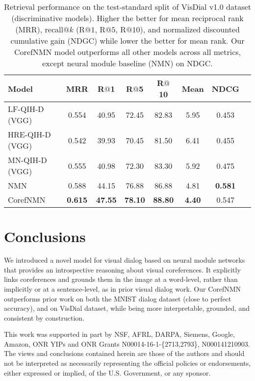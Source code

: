 \documentclass[runningheads]{llncs}
\makeatletter
\def\adl@drawiv#1#2#3{\hskip.5\tabcolsep
        \xleaders#3{#2.5\@tempdimb #1{1}#2.5\@tempdimb}#2\z@ plus1fil minus1fil\relax
        \hskip.5\tabcolsep}
\newcommand{\cdashlinelr}[1]{\noalign{\vskip\aboverulesep
           \global\let\@dashdrawstore\adl@draw
           \global\let\adl@draw\adl@drawiv}
  \cdashline{#1}
  \noalign{\global\let\adl@draw\@dashdrawstore
           \vskip\belowrulesep}}
\newcommand{\nmn}{CorefNMN\xspace}
\newcommand{\myparagraph}[1]{\vspace{0pt}\noindent{\bf #1}}
\makeatother
\begin{document}
\begin{table}[t]
	\centering
	\setlength{\tabcolsep}{6pt}
    \begin{tabular}{lccccccc}
	\toprule
	\textbf{Model} & \textbf{MRR} & \textbf{R$@$1} & \textbf{R$@$5}
    				& \textbf{R$@$10} & \textbf{Mean} & \textbf{NDCG}\\
	\midrule
	LF-QIH-D \cite{visdial} (VGG) & 0.554 & 40.95 & 72.45 & 82.83 & 5.95 & 0.453 \\
    HRE-QIH-D \cite{visdial} (VGG) & 0.542 & 39.93 & 70.45 & 81.50 & 6.41 & 0.455\\
    MN-QIH-D \cite{visdial} (VGG) & 0.555 & 40.98 & 72.30 & 83.30 & 5.92 & 0.475 \\
	\cdashlinelr{1-7}
NMN \cite{hu2017learning} & 0.588 & 44.15 & 76.88 & 86.88 & 4.81 & \textbf{0.581} \\
	\cdashlinelr{1-7}
    \nmn & \textbf{0.615} & \textbf{47.55} & \textbf{78.10} & \textbf{88.80} & \textbf{4.40} & 0.547 \\
    \bottomrule
	\end{tabular}
\caption{
    Retrieval performance on the test-standard split of VisDial v1.0
    dataset \cite{visdial} (discriminative models).
    Higher the better for mean reciprocal rank (MRR), recall$@k$ 
    (R$@1$, R$@5$, R$@10$), and normalized discounted cumulative gain (NDGC) 
    while lower the better for mean rank.
    Our \nmn model outperforms all other models across all metrics, except neural
    module baseline (NMN) on NDGC.}
    \label{tab:visdial_v1_result_table}
\end{table}  
\section{Conclusions}
We introduced a novel model for visual dialog based on neural module networks
that provides an introspective reasoning about visual coreferences.
It explicitly links coreferences and grounds them in the 
image at a word-level, rather than implicitly or at a sentence-level, as in prior visual dialog work.
Our \nmn outperforms prior work on both the MNIST dialog dataset (close to perfect accuracy), and on VisDial dataset, while being more interpretable, grounded, and consistent by construction.


\begingroup
\footnotesize
\myparagraph{Acknowledgements.}
This work was supported in part by NSF, AFRL, DARPA, Siemens, Google, Amazon, 
ONR YIPs and ONR Grants N00014-16-1-\{2713,2793\}, N000141210903. 
The views and conclusions contained herein are those of the authors and should 
not be interpreted as necessarily representing the official policies or 
endorsements, either expressed or implied, of the U.S. Government, or any 
sponsor.
\endgroup \newpage
\appendix
\end{document}
